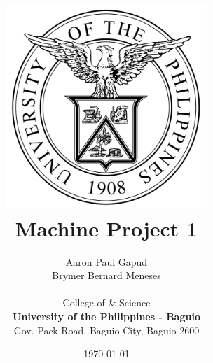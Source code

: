 \documentclass[11pt]{report}
\title{
\includegraphics[width=3in]{upbag.png} \\
\vspace*{1in}
\textbf{Machine Project 1}
}
\author{Aaron Paul Gapud\\
        Brymer Bernard Meneses\\
		\vspace*{0.5in} \\
		College of \& Science\\
        \textbf{University of the Philippines - Baguio}\\
        Gov. Pack Road, Baguio City, Baguio 2600
       } \date{\today}
\date{}
\begin{document}
\maketitle
\tableofcontents

\section*{}
\end{document}
